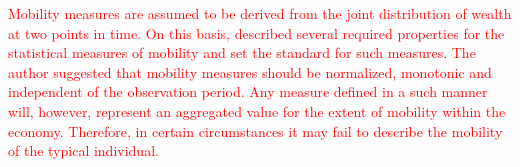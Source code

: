 \documentclass[11pt]{article}
\newcommand{\eg}{{\it e.g.}\xspace}
\numberwithin{equation}{section}
\begin{document}
\textcolor{red}{Mobility measures are assumed to be derived from the joint distribution of wealth at two points in time. On this basis, \citet{Shorrocks1978} described several required properties for the statistical measures of mobility and set the standard for such measures. The author suggested that mobility measures should be normalized, monotonic and independent of the observation period. Any measure defined in a such manner will, however, represent an aggregated value for the extent of mobility within the economy. Therefore, in certain circumstances it may fail to describe the mobility of the typical individual.}





\end{document}
